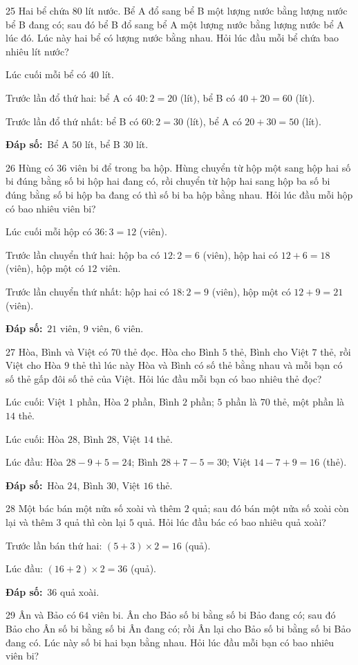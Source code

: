 \documentclass[11pt]{article}
\newif\ifsol \solfalse
\providecommand{\AnsWord}{Đáp số}
\newcommand{\dapso}[1]{\par\textbf{\AnsWord:}\ #1}
\newcommand{\probsol}[1]{%
  \begin{lrbox}{\solmeasure}\begin{minipage}{\dimexpr\linewidth-24pt\relax}#1\end{minipage}\end{lrbox}%
  \ifsol
    \begin{solbox}#1\end{solbox}%
  \else
    \setlength{\solht}{\dimexpr\ht\solmeasure+\dp\solmeasure+0.85cm\relax}%
    \ifdim\solht<1.35cm\setlength{\solht}{1.35cm}\fi
    \begin{tcolorbox}[colback=white,colframe=Line,boxrule=0.8pt,arc=5pt,
      left=8pt,right=8pt,top=4pt,bottom=4pt,height=\solht]{\footnotesize\color{Slate}\itshape\WorkWord}\end{tcolorbox}%
  \fi}
\newcommand{\gap}{\vspace{0.3cm}}
\def\WorkWord{Bài làm:}
\def\AnsWord{Đáp số}
\begin{document}
\gap
\begin{probbox}{25}{\relax}
Hai bể chứa $80$ lít nước. Bể A đổ sang bể B một lượng nước bằng lượng nước bể B đang có; sau đó bể B đổ sang bể A một lượng nước bằng lượng nước bể A lúc đó. Lúc này hai bể có lượng nước bằng nhau. Hỏi lúc đầu mỗi bể chứa bao nhiêu lít nước?
\end{probbox}
\probsol{
Lúc cuối mỗi bể có $40$ lít.\par
Trước lần đổ thứ hai: bể A có $40:2=20$ (lít), bể B có $40+20=60$ (lít).\par
Trước lần đổ thứ nhất: bể B có $60:2=30$ (lít), bể A có $20+30=50$ (lít).
\dapso{Bể A $50$ lít, bể B $30$ lít.}}
\gap
\begin{probbox}{26}{\relax}
Hùng có $36$ viên bi để trong ba hộp. Hùng chuyển từ hộp một sang hộp hai số bi đúng bằng số bi hộp hai đang có, rồi chuyển từ hộp hai sang hộp ba số bi đúng bằng số bi hộp ba đang có thì số bi ba hộp bằng nhau. Hỏi lúc đầu mỗi hộp có bao nhiêu viên bi?
\end{probbox}
\probsol{
Lúc cuối mỗi hộp có $36:3=12$ (viên).\par
Trước lần chuyển thứ hai: hộp ba có $12:2=6$ (viên), hộp hai có $12+6=18$ (viên), hộp một có $12$ viên.\par
Trước lần chuyển thứ nhất: hộp hai có $18:2=9$ (viên), hộp một có $12+9=21$ (viên).
\dapso{$21$ viên, $9$ viên, $6$ viên.}}
\gap
\begin{probbox}{27}{\relax}
Hòa, Bình và Việt có $70$ thẻ đọc. Hòa cho Bình $5$ thẻ, Bình cho Việt $7$ thẻ, rồi Việt cho Hòa $9$ thẻ thì lúc này Hòa và Bình có số thẻ bằng nhau và mỗi bạn có số thẻ gấp đôi số thẻ của Việt. Hỏi lúc đầu mỗi bạn có bao nhiêu thẻ đọc?
\end{probbox}
\probsol{
Lúc cuối: Việt $1$ phần, Hòa $2$ phần, Bình $2$ phần; $5$ phần là $70$ thẻ, một phần là $14$ thẻ.\par
Lúc cuối: Hòa $28$, Bình $28$, Việt $14$ thẻ.\par
Lúc đầu: Hòa $28-9+5=24$; Bình $28+7-5=30$; Việt $14-7+9=16$ (thẻ).
\dapso{Hòa $24$, Bình $30$, Việt $16$ thẻ.}}
\gap
\begin{probbox}{28}{\relax}
Một bác bán một nửa số xoài và thêm $2$ quả; sau đó bán một nửa số xoài còn lại và thêm $3$ quả thì còn lại $5$ quả. Hỏi lúc đầu bác có bao nhiêu quả xoài?
\end{probbox}
\probsol{
Trước lần bán thứ hai: $(5+3)\times2=16$ (quả).\par
Lúc đầu: $(16+2)\times2=36$ (quả).
\dapso{$36$ quả xoài.}}
\gap
\begin{probbox}{29}{\relax}
Ân và Bảo có $64$ viên bi. Ân cho Bảo số bi bằng số bi Bảo đang có; sau đó Bảo cho Ân số bi bằng số bi Ân đang có; rồi Ân lại cho Bảo số bi bằng số bi Bảo đang có. Lúc này số bi hai bạn bằng nhau. Hỏi lúc đầu mỗi bạn có bao nhiêu viên bi?
\end{probbox}
\end{document}
